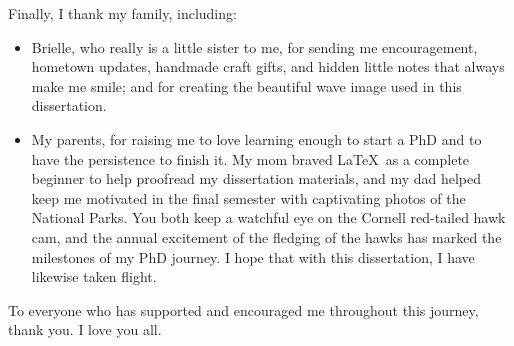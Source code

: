 Finally, I thank my family, including:
\begin{itemize}
  \item Brielle, who really is a little sister to me, 
  for sending me encouragement, hometown updates, handmade craft gifts, 
  and hidden little notes that always make me smile;
  and for creating the beautiful wave image used in this dissertation.
  \item My parents, for raising me to love learning enough to start a PhD 
  and to have the persistence to finish it.
  My mom braved \LaTeX\ as a complete beginner to help proofread my dissertation materials,
  and my dad helped keep me motivated in the final semester with captivating photos of the National Parks.
  You both keep a watchful eye on the Cornell red-tailed hawk cam, 
  and the annual excitement of the fledging of the hawks has marked the milestones of my PhD journey.
  I hope that with this dissertation, I have likewise taken flight.
\end{itemize}


To everyone who has supported and encouraged me throughout this journey, thank you.
I love you all.

